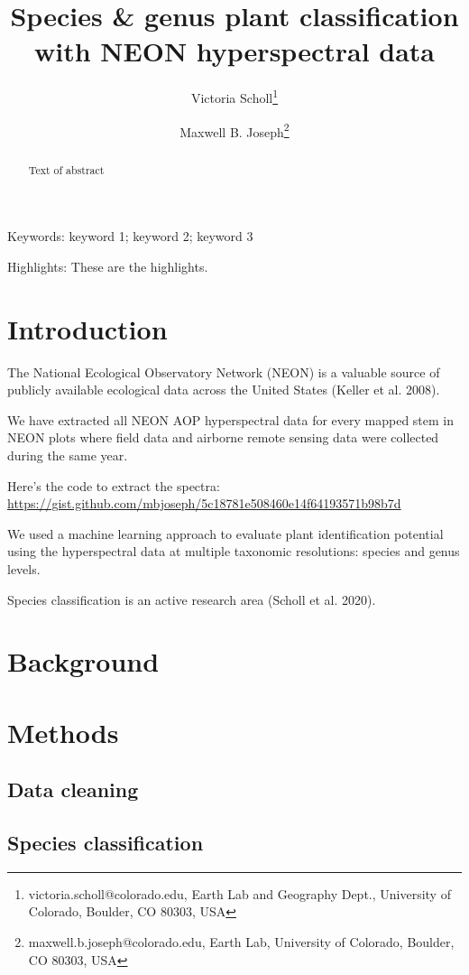 \documentclass[
]{article}
\title{Species \& genus plant classification with NEON hyperspectral data}
\author{Victoria Scholl\thanks{victoria.scholl@colorado.edu, Earth Lab and Geography Dept., University of Colorado, Boulder, CO 80303, USA} \and Maxwell B. Joseph\thanks{maxwell.b.joseph@colorado.edu, Earth Lab, University of Colorado, Boulder, CO 80303, USA}}
\date{}
\begin{document}
\maketitle
\begin{abstract}
Text of abstract
\end{abstract}

Keywords: keyword 1; keyword 2; keyword 3

Highlights: These are the highlights.

\hypertarget{introduction}{%
\section{Introduction}\label{introduction}}

The National Ecological Observatory Network (NEON) is a valuable source of publicly available ecological data across the United States (Keller et al. 2008).

We have extracted all NEON AOP hyperspectral data for every mapped stem in NEON plots where field data and airborne remote sensing data were collected during the same year.

Here's the code to extract the spectra: \url{https://gist.github.com/mbjoseph/5c18781e508460e14f64193571b98b7d}

We used a machine learning approach to evaluate plant identification potential using the hyperspectral data at multiple taxonomic resolutions: species and genus levels.

Species classification is an active research area (Scholl et al. 2020).

\hypertarget{background}{%
\section{Background}\label{background}}

\hypertarget{methods}{%
\section{Methods}\label{methods}}

\hypertarget{data-cleaning}{%
\subsection{Data cleaning}\label{data-cleaning}}

\hypertarget{species-classification}{%
\subsection{Species classification}\label{species-classification}}
\end{document}
